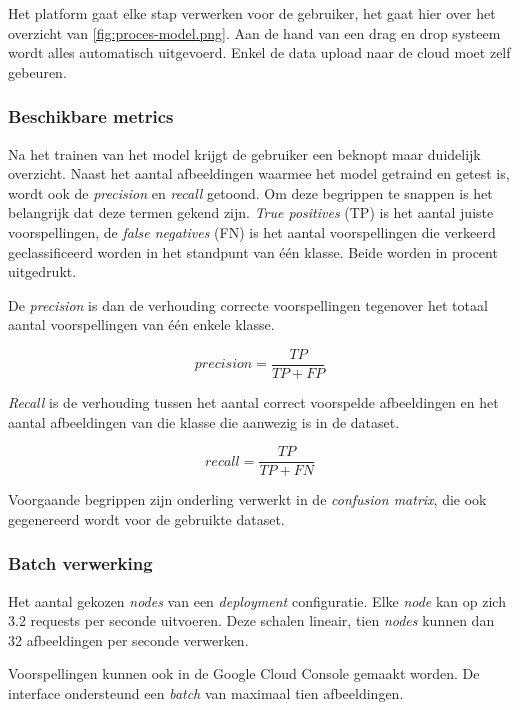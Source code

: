 Het platform gaat elke stap verwerken voor de gebruiker, het gaat hier over het overzicht van \ref{fig:proces-model.png}. Aan de hand van een drag en drop systeem wordt alles automatisch uitgevoerd. Enkel de data upload naar de cloud moet zelf gebeuren.

\subsubsection{Beschikbare metrics}
\label{sucsubsec:google-fr-metrics}

Na het trainen van het model krijgt de gebruiker een beknopt maar duidelijk overzicht. Naast het aantal afbeeldingen waarmee het model getraind en getest is, wordt ook de \textit{precision} en \textit{recall} getoond. Om deze begrippen te snappen is het belangrijk dat deze termen gekend zijn. \textit{True positives} (TP) is het aantal juiste voorspellingen, de \textit{false negatives} (FN) is het aantal voorspellingen die verkeerd geclassificeerd worden in het standpunt van één klasse. Beide worden in procent uitgedrukt.

De \textit{precision} is dan de verhouding correcte voorspellingen tegenover het totaal aantal voorspellingen van één enkele klasse.

\begin{equation}
    precision=\frac{TP}{TP+FP}
\end{equation}

\textit{Recall} is de verhouding tussen het aantal correct voorspelde afbeeldingen en het aantal afbeeldingen van die klasse die aanwezig is in de dataset.

\begin{equation}
    recall=\frac{TP}{TP+FN}
\end{equation}

Voorgaande begrippen zijn onderling verwerkt in de \textit{confusion matrix}, die ook gegenereerd wordt voor de gebruikte dataset.

\subsubsection{Batch verwerking}
\label{sucsubsec:google-fr-batch}

Het aantal gekozen \textit{nodes} van een \textit{deployment} configuratie. Elke \textit{node} kan op zich 3.2 requests per seconde uitvoeren. Deze schalen lineair, tien \textit{nodes} kunnen dan 32 afbeeldingen per seconde verwerken.

Voorspellingen kunnen ook in de Google Cloud Console gemaakt worden. De interface ondersteund een \textit{batch} van maximaal tien afbeeldingen. 

